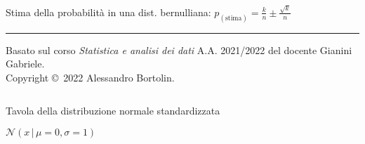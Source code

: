 \documentclass[10pt,landscape]{article}
\begin{document}
\begin{multicols}{3}
Stima della probabilità in una dist. bernulliana: $p_{(\text{stima})} = \frac{k}{n} \pm \frac{\sqrt{k}}{n}$ \\

\vspace{0.3em}

\rule{29em}{0.4pt}

\vspace{0.7em}

\begin{wrapfigure}[3]{r}{8em}
	\vspace{-1.5em}
	\centering
	\doclicenseImage[imagewidth=7em]
\end{wrapfigure}

Basato sul corso \emph{Statistica e analisi dei dati} A.A. 2021/2022 del docente Gianini Gabriele. \\

Copyright \copyright \, 2022 Alessandro Bortolin.

\doclicenseText

\end{multicols}

\pagebreak

\begin{landscape}
	{\Huge $\phantom{}$ \break \break \break}

	\centering
	{\huge Tavola della distribuzione normale standardizzata} \break

	\centering
	{\large $\mathcal{N}(x \, | \, \mu = 0, \sigma = 1)$}

	\centering
	

	\centering
	{\large}
\end{landscape}
\end{document}
